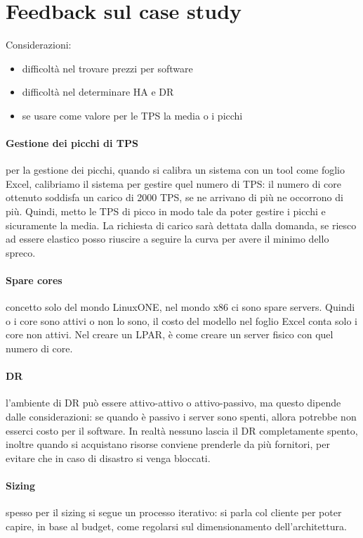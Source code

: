 \documentclass{article}
\begin{document}
\section{Feedback sul case study}
Considerazioni:
\begin{itemize}
\item difficoltà nel trovare prezzi per software
\item difficoltà nel determinare HA e DR
\item se usare come valore per le TPS la media o i picchi
\end{itemize}
\paragraph{Gestione dei picchi di TPS}per la gestione dei picchi, quando si calibra un sistema con un tool come foglio Excel, calibriamo il sistema per gestire quel numero di TPS: il numero di core ottenuto soddisfa un carico di 2000 TPS, se ne arrivano di più ne occorrono di più. Quindi, metto le TPS di picco in modo tale da poter gestire i picchi e sicuramente la media. La richiesta di carico sarà dettata dalla domanda, se riesco ad essere elastico posso riuscire a seguire la curva per avere il minimo dello spreco.

\paragraph{Spare cores}concetto solo del mondo LinuxONE, nel mondo x86 ci sono spare servers. Quindi o i core sono attivi o non lo sono, il costo del modello nel foglio Excel conta solo i core non attivi. Nel creare un LPAR, è come creare un server fisico con quel numero di core.
\paragraph{DR}l'ambiente di DR può essere attivo-attivo o attivo-passivo, ma questo dipende dalle considerazioni: se quando è passivo i server sono spenti, allora potrebbe non esserci costo per il software. In realtà nessuno lascia il DR completamente spento, inoltre quando si acquistano risorse conviene prenderle da più fornitori, per evitare che in caso di disastro si venga bloccati.
\paragraph{Sizing}spesso per il sizing si segue un processo iterativo: si parla col cliente per poter capire, in base al budget, come regolarsi sul dimensionamento dell'architettura.
\end{document}
